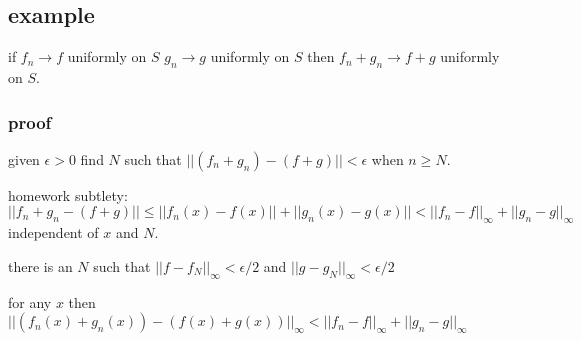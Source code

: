 \documentclass[letterpaper]{article}
\begin{document}
\subsection*{example}
if $f_n\to f$ uniformly on $S$ $g_n\to g$ uniformly on $S$ then $f_n+g_n\to f+g$ uniformly on $S$.
\subsubsection*{proof}
given $\epsilon>0$ find $N$ such that $||(f_n+g_n)-(f+g)||<\epsilon$ when $n\ge N$. 


homework subtlety: $||f_n+g_n-(f+g)||\le ||f_n(x)-f(x)||+||g_n(x)-g(x)||<||f_n-f||_{\infty}+||g_n-g||_\infty$ independent of $x$ and $N$.

there is an $N$ such that $||f-f_N||_\infty<\epsilon/2$ and $||g-g_N||_\infty<\epsilon/2$

for any  $x$ then $||(f_n(x)+g_n(x))-(f(x)+g(x))||_\infty<||f_n-f||_\infty+||g_n-g||_\infty$
\end{document}
